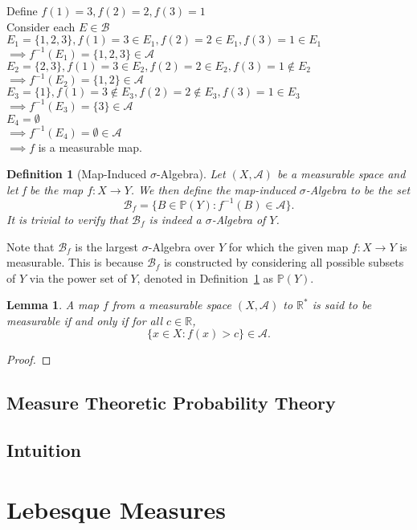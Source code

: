 \documentclass[10pt, oneside]{article}
\newcommand{\R}{\mathbb{R}}
\newtheorem{defn}{Definition}
\newtheorem{lem}{Lemma}
\begin{document}
Define $f(1)=3,f(2)=2,f(3)=1$\\
Consider each $E\in \mathcal{B}$ \\
$E_1=\{1,2,3\},f(1)=3\in E_1,f(2)=2\in E_1,f(3)=1\in E_1$\\ $\implies f^{-1}(E_1)=\{1,2,3\}\in \mathcal{A}$ \checkmark\\

$E_2=\{2,3\},f(1)=3\in E_2,f(2)=2\in E_2,f(3)=1\notin E_2$\\ $\implies f^{-1}(E_2)=\{1,2\}\in \mathcal{A}$ \checkmark\\

$E_3=\{1\},f(1)=3\notin E_3,f(2)=2\notin E_3, f(3)=1\in E_3$\\ $\implies f^{-1}(E_3)=\{3\}\in \mathcal{A}$ \checkmark\\

$E_4=\emptyset$\\ $\implies f^{-1}(E_4)=\emptyset\in \mathcal{A}$ \checkmark\\

$\implies f$ is a measurable map. 

\begin{defn}[Map-Induced $\sigma$-Algebra]
    \label{defn:map-ind-SA}
    Let $(X,\mathcal{A})$ be a measurable space and let f be the map $f \colon X 
    \to Y$. We then define the map-induced $\sigma$-Algebra to be the set 
    \[\mathcal{B}_f = \{B \in \mathbb{P}(Y) \colon f^{-1}(B) \in \mathcal{A}\}. \]
    It is trivial to verify that $\mathcal{B}_f$ is indeed a $\sigma$-Algebra of $Y$. 
\end{defn}

Note that $\mathcal{B}_f$ is the largest $\sigma$-Algebra over $Y$ for which the 
given map $f \colon X \to Y$ is measurable. This is because $\mathcal{B}_f$ is 
constructed by considering all possible subsets of $Y$ via the power set of $Y$, 
denoted in Definition~\ref{defn:map-ind-SA} as $\mathbb{P}(Y)$. 

\begin{lem}
    A map $f$ from a measurable space $(X,\mathcal{A})$ to $\R^{*}$ is said to be 
    measurable if and only if for all $c \in \R$, 
    \[\{x \in X \colon f(x) > c\} \in \mathcal{A}. \]
\end{lem}

\begin{proof}
    
\end{proof}

\subsection{Measure Theoretic Probability Theory}

\subsection{Intuition}

\section{Lebesque Measures}
\end{document}
